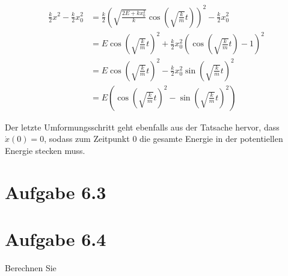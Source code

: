 \documentclass{theozettel}
\begin{document}
\begin{align}
\frac{k}{2}x^{2} - \frac{k}{2}x_0^{2} &= \frac{k}{2}\left(\sqrt{\frac{2 E + k x_0^{2}}{k}} \cos(\sqrt{\frac{k}{m}} t)\right)^{2} - \frac{k}{2}x_0^{2} \\
&= E \cos(\sqrt{\frac{k}{m}} t)^{2} + \frac{k}{2}x_0^{2} (\cos(\sqrt{\frac{k}{m}} t) - 1)^{2} \\
&= E \cos(\sqrt{\frac{k}{m}} t)^{2} - \frac{k}{2}x_0^{2} \sin(\sqrt{\frac{k}{m}} t)^{2}\\
&=  E \left( \cos(\sqrt{\frac{k}{m}} t)^{2} - \sin(\sqrt{\frac{k}{m}} t)^{2} \right)
\end{align}

Der letzte Umformungsschritt geht ebenfalls aus der Tatsache hervor, dass $\dot{x}(0) = 0$, sodass zum Zeitpunkt $0$ die gesamte Energie in der potentiellen Energie stecken muss.



\section*{Aufgabe 6.3} 





\section*{Aufgabe 6.4} 
Berechnen Sie
\end{document}
